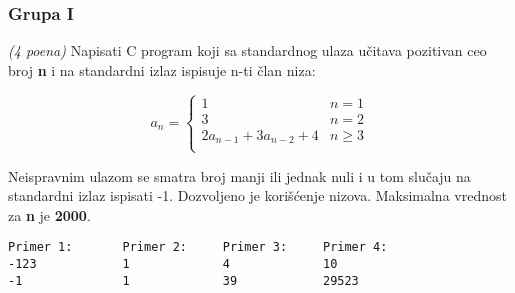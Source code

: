 \subsubsection{Grupa I}

\begin{Exercise}[label=v1.3_01] 
{\em (4 poena)} Napisati C program koji sa standardnog ulaza učitava
pozitivan ceo broj \textbf{n} i na standardni izlaz ispisuje n-ti član
niza:

 $$ a_n= \begin{cases}
                  1 & n = 1 \\
                  3 & n = 2 \\
                  2a_{n-1} + 3a_{n-2} + 4 & n \geq 3 \\
                  \end{cases}  $$

Neispravnim ulazom se smatra broj manji ili jednak nuli i u tom
slučaju na standardni izlaz ispisati -1.  Dozvoljeno je kori\v
s\'cenje nizova. Maksimalna vrednost za {\bf n} je {\bf 2000}.
\begin{center}
\begin{verbatim}
Primer 1:       Primer 2:     Primer 3:     Primer 4:  
-123            1             4             10
-1              1             39            29523
\end{verbatim}
\end{center}
\end{Exercise}
\begin{Answer}[ref=v1.3_01]
\end{Answer}


